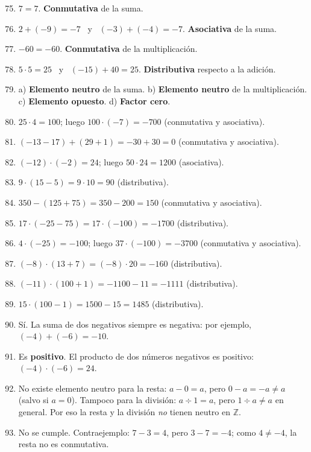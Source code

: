 \documentclass[12pt, letterpaper]{article}
\newcommand{\Z}{\mathbb{Z}}
\begin{document}
\begin{enumerate}[leftmargin=*, label=\textbf{\arabic*.}]
  \setcounter{enumi}{74}
  \item $7 = 7$. \textbf{Conmutativa} de la suma.
  \item $2 + (-9) = -7$ \ y \ $(-3) + (-4) = -7$. \textbf{Asociativa} de la suma.
  \item $-60 = -60$. \textbf{Conmutativa} de la multiplicación.
  \item $5 \cdot 5 = 25$ \ y \ $(-15) + 40 = 25$. \textbf{Distributiva} respecto a la adición.
  \item a) \textbf{Elemento neutro} de la suma. \quad b) \textbf{Elemento neutro} de la multiplicación. \quad c) \textbf{Elemento opuesto}. \quad d) \textbf{Factor cero}.
  \item $25 \cdot 4 = 100$; luego $100 \cdot (-7) = -700$ (conmutativa y asociativa).
  \item $(-13 - 17) + (29 + 1) = -30 + 30 = 0$ (conmutativa y asociativa).
  \item $(-12) \cdot (-2) = 24$; luego $50 \cdot 24 = 1200$ (asociativa).
  \item $9 \cdot (15 - 5) = 9 \cdot 10 = 90$ (distributiva).
  \item $350 - (125 + 75) = 350 - 200 = 150$ (conmutativa y asociativa).
  \item $17 \cdot (-25 - 75) = 17 \cdot (-100) = -1700$ (distributiva).
  \item $4 \cdot (-25) = -100$; luego $37 \cdot (-100) = -3700$ (conmutativa y asociativa).
  \item $(-8) \cdot (13 + 7) = (-8) \cdot 20 = -160$ (distributiva).
  \item $(-11) \cdot (100 + 1) = -1100 - 11 = -1111$ (distributiva).
  \item $15 \cdot (100 - 1) = 1500 - 15 = 1485$ (distributiva).
  \item Sí. La suma de dos negativos siempre es negativa: por ejemplo, $(-4) + (-6) = -10$.
  \item Es \textbf{positivo}. El producto de dos números negativos es positivo: $(-4) \cdot (-6) = 24$.
  \item No existe elemento neutro para la resta: $a - 0 = a$, pero $0 - a = -a \neq a$ (salvo si $a = 0$). Tampoco para la división: $a \div 1 = a$, pero $1 \div a \neq a$ en general. Por eso la resta y la división \emph{no} tienen neutro en $\Z$.
  \item No se cumple. Contraejemplo: $7 - 3 = 4$, pero $3 - 7 = -4$; como $4 \neq -4$, la resta no es conmutativa.
\end{enumerate}
\end{document}
